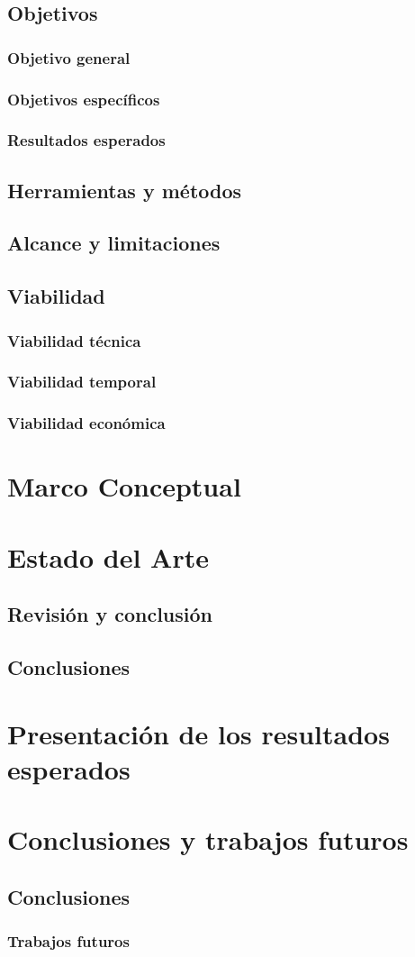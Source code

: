 \documentclass[a4paper,openright,12pt]{report}
\begin{document}
\section{Objetivos}
\subsection{Objetivo general}
\subsection{Objetivos específicos}
\subsection{Resultados esperados}
\section{Herramientas y métodos}
\section{Alcance y limitaciones}
\section{Viabilidad}
\subsection{Viabilidad técnica}
\subsection{Viabilidad temporal}
\subsection{Viabilidad económica}
\chapter{Marco Conceptual}
\chapter{Estado del Arte}
\section{Revisión y conclusión}
\section{Conclusiones}
\chapter{Presentación de los resultados esperados}
\chapter{Conclusiones y trabajos futuros}
\section{Conclusiones}
\subsection{Trabajos futuros}


{}
\end{document}
